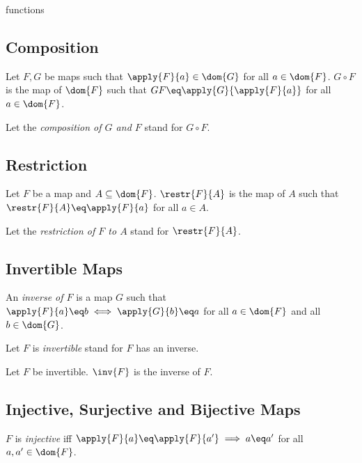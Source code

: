 \documentclass{article}
\begin{document}
\begin{smodule}{functions}
\subsection{Composition}

\begin{definition*}[forthel,id=CompositionDef,printid]
  Let $F,G$ be maps such that $\apply{F}{a}\in\dom{G}$ for all $a\in\dom{F}$.
  $G\circ F$ is the map of $\dom{F}$ such that $G\circ F\eq\apply{G}{\apply{F}{a}}$ for all $a\in\dom{F}$.

  Let the \emph{composition of $G$ and $F$} stand for $G\circ F$.
\end{definition*}


\subsection{Restriction}

\begin{definition*}[forthel,id=RestrictionDef,printid]
  Let $F$ be a map and $A\subseteq\dom{F}$.
  $\restr{F}{A}$ is the map of $A$ such that $\restr{F}{A}\eq \apply{F}{a}$ for all $a\in A$.

  Let the \emph{restriction of $F$ to $A$} stand for $\restr{F}{A}$.
\end{definition*}


\subsection{Invertible Maps}

\begin{definition*}[forthel,id=InvertibleDef,printid]
  An \emph{inverse of $F$} is a map $G$ such that $\apply{F}{a}\eq b\iff \apply{G}{b}\eq a$ for all $a\in\dom{F}$ and all $b\in\dom{G}$.

  Let $F$ is \emph{invertible} stand for $F$ has an inverse.
\end{definition*}

\begin{definition*}[forthel,id=InverseMapDef,printid]
  Let $F$ be invertible.
  $\inv{F}$ is the inverse of $F$.
\end{definition*}


\subsection{Injective, Surjective and Bijective Maps}

\begin{definition*}[forthel,id=InjectionDef,printid]
  $F$ is \emph{injective} iff $\apply{F}{a}\eq\apply{F}{a'}\implies a\eq a'$ for all $a,a'\in\dom{F}$.
\end{definition*}


\end{smodule}
\end{document}
